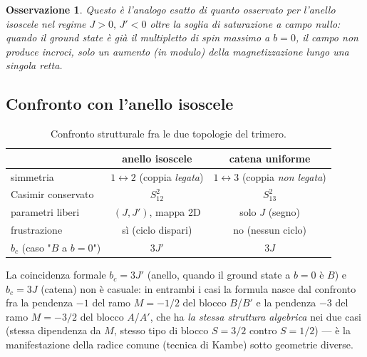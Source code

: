 \documentclass[11pt,a4paper]{article}
\newtheorem{osservazione}{Osservazione}
\begin{document}
\begin{osservazione}
Questo è l'analogo esatto di quanto osservato per l'anello isoscele nel
regime $J>0,\,J'<0$ oltre la soglia di saturazione a campo nullo: quando il
ground state è già il multipletto di spin massimo a $b=0$, il campo non
produce incroci, solo un aumento (in modulo) della magnetizzazione lungo una
singola retta.
\end{osservazione}

\subsection{Confronto con l'anello isoscele}

\begin{table}[h]
\centering
\begin{tabular}{@{}lcc@{}}
\toprule
 & anello isoscele & catena uniforme \\
\midrule
simmetria & $1\leftrightarrow2$ (coppia \emph{legata}) & $1\leftrightarrow3$ (coppia \emph{non legata}) \\
Casimir conservato & $S_{12}^2$ & $S_{13}^2$ \\
parametri liberi & $(J,J')$, mappa 2D & solo $J$ (segno) \\
frustrazione & sì (ciclo dispari) & no (nessun ciclo) \\
$b_c$ (caso "$B$ a $b{=}0$") & $3J'$ & $3J$ \\
\bottomrule
\end{tabular}
\caption{Confronto strutturale fra le due topologie del trimero.}
\end{table}

La coincidenza formale $b_c=3J'$ (anello, quando il ground state a $b=0$ è
$B$) e $b_c=3J$ (catena) non è casuale: in entrambi i casi la formula nasce
dal confronto fra la pendenza $-1$ del ramo $M=-1/2$ del blocco $B$/$B'$ e
la pendenza $-3$ del ramo $M=-3/2$ del blocco $A$/$A'$, che ha \emph{la
stessa struttura algebrica} nei due casi (stessa dipendenza da $M$, stesso
tipo di blocco $S=3/2$ contro $S=1/2$) — è la manifestazione della radice
comune (tecnica di Kambe) sotto geometrie diverse.

\FloatBarrier
\end{document}

